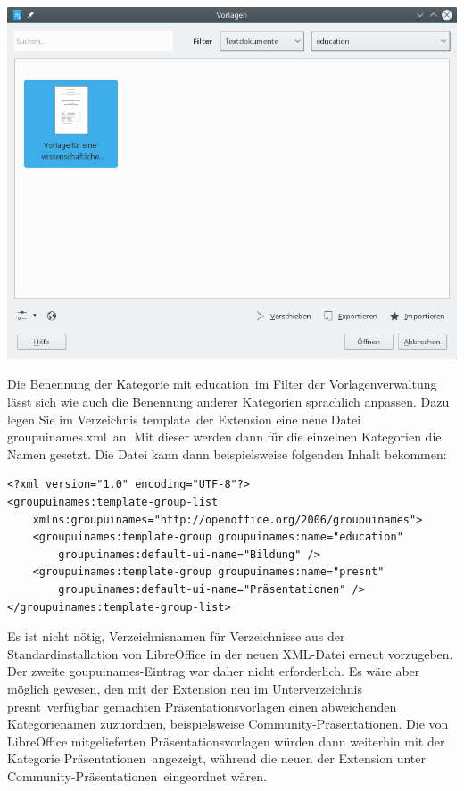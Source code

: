 \documentclass[a4paper,10pt,pagesize,titlepage]{scrbook}
\begin{document}
\begin{center}
	\includegraphics[width=0.9\linewidth]{pics/template_administration_dialog_with_new_template_section}
	\label{fig:template_administration_dialog_with_new_template_section}
\end{center}



Die Benennung der Kategorie mit \glqq education\grqq~im Filter der Vorlagenverwaltung lässt sich wie auch die Benennung anderer Kategorien sprachlich anpassen. Dazu legen Sie im Verzeichnis \glqq template\grqq~der Extension eine neue Datei \glqq groupuinames.xml\grqq~an. Mit dieser werden dann für die einzelnen Kategorien die Namen gesetzt. Die Datei kann dann beispielsweise folgenden Inhalt bekommen:

\begin{lstlisting}[language={[LaTeX]TeX},inputencoding={utf8},extendedchars=false]
<?xml version="1.0" encoding="UTF-8"?>
<groupuinames:template-group-list
    xmlns:groupuinames="http://openoffice.org/2006/groupuinames">
    <groupuinames:template-group groupuinames:name="education"
        groupuinames:default-ui-name="Bildung" />
    <groupuinames:template-group groupuinames:name="presnt"
        groupuinames:default-ui-name="Präsentationen" />
</groupuinames:template-group-list>

\end{lstlisting}

Es ist nicht nötig, Verzeichnisnamen für Verzeichnisse aus der Standardinstallation von LibreOffice in der neuen XML-Datei erneut vorzugeben. Der zweite goupuinames-Eintrag war daher nicht erforderlich. Es wäre aber möglich gewesen, den mit der Extension neu im Unterverzeichnis \glqq presnt\grqq~verfügbar gemachten Präsentationsvorlagen einen abweichenden Kategorienamen zuzuordnen, beispielsweise \glqq Community-Präsentationen\grqq. Die von LibreOffice mitgelieferten Präsentationsvorlagen würden dann weiterhin mit der Kategorie \glqq Präsentationen\grqq~angezeigt, während die neuen der Extension unter \glqq Community-Präsentationen\grqq~eingeordnet wären.
\end{document}
